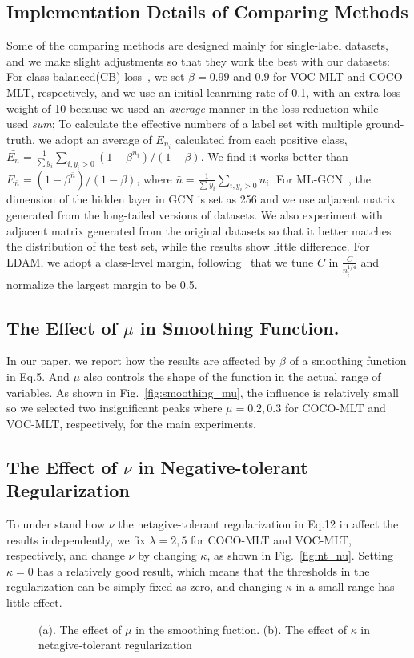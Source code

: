 \documentclass[runningheads]{llncs}
\begin{document}
\subsection{Implementation Details of Comparing Methods}
Some of the comparing methods are designed mainly for single-label datasets, and we make slight adjustments so that they work the best with our datasets:
For class-balanced(CB) loss~\cite{cui2019cb}, we set $\beta=0.99$ and $0.9$ for VOC-MLT and COCO-MLT, respectively, and we use an initial leanrning rate of 0.1, with an extra loss weight of 10 because we used an \textit{average} manner in the loss reduction while ~\cite{cui2019cb} used \textit{sum}; 
To calculate the effective numbers of a label set with multiple ground-truth, we adopt an average of $E_{n_i}$ calculated from each positive class, $\bar{E_n}=\frac{1}{\sum y_i} \sum_{i, y_i>0}{(1-\beta^{n_i})/(1-\beta)}$. 
We find it works better than $E_{\bar{n}}={(1-\beta^{\bar{n}})/(1-\beta)}$, where $\bar{n}=\frac{1}{\sum y_i}\sum_{i, y_i>0}n_i$.
For ML-GCN~\cite{chen2019mlgcn}, the dimension of the hidden layer in GCN is set as 256 and we use adjacent matrix generated from the long-tailed versions of datasets.
We also experiment with adjacent matrix generated from the original datasets so that it better matches the distribution of the test set, while the results show little difference.
For LDAM, we adopt a class-level margin, following~\cite{cao2019ldam} that we tune $C$ in $\frac{C}{n_i^{1/4}}$ and normalize the largest margin to be 0.5.

\subsection{The Effect of $\mu$ in Smoothing Function.}
In our paper, we report how the results are affected by $\beta$ of a smoothing function in Eq.5. And $\mu$ also controls the shape of the function in the actual range of variables.
As shown in Fig.~\ref{fig:smoothing_mu}, the influence is relatively small so we selected two insignificant peaks where $\mu = 0.2, 0.3$ for COCO-MLT and VOC-MLT, respectively, for the main experiments.
\subsection{The Effect of $\nu$ in Negative-tolerant Regularization}
To under stand how $\nu$ the netagive-tolerant regularization in Eq.12 in affect the results independently, we fix $\lambda=2,5$ for COCO-MLT and VOC-MLT, respectively, and change $\nu$ by changing $\kappa$, as shown in Fig.~\ref{fig:nt_nu}.
Setting $\kappa=0$ has a relatively good result, which means that the thresholds in the regularization can be simply fixed as zero, and changing $\kappa$ in a small range has little effect.

\begin{figure}[t]
     \hfill
    \subfloat[\label{fig:nt_nu}]{\texttt{[image: nt\_nu]}}
    \caption{
        (a). The effect of $\mu$ in the smoothing fuction.
        (b). The effect of $\kappa$ in netagive-tolerant regularization 
    }
\end{figure}
 
\end{document}
